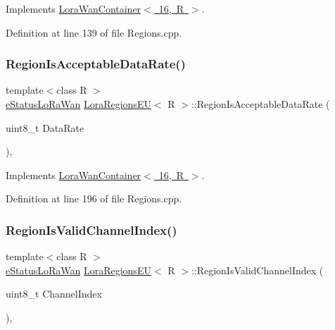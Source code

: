 Implements \mbox{\hyperlink{class_lora_wan_container_aeacbb5b9a6ca06708c095c2f67aae93e}{Lora\+Wan\+Container$<$ 16, R $>$}}.



Definition at line 139 of file Regions.\+cpp.

\mbox{\label{class_lora_regions_e_u_a367dcb126971269dce46511383696bad}} 
\subsubsection{\texorpdfstring{Region\+Is\+Acceptable\+Data\+Rate()}{RegionIsAcceptableDataRate()}}
{\footnotesize\ttfamily template$<$class R $>$ \\
\mbox{\hyperlink{_define_8h_a1cea710adbbf5b02bced8f79cd82f7b9}{e\+Status\+Lo\+Ra\+Wan}} \mbox{\hyperlink{class_lora_regions_e_u}{Lora\+Regions\+EU}}$<$ R $>$\+::Region\+Is\+Acceptable\+Data\+Rate (\begin{DoxyParamCaption}\item[{uint8\+\_\+t}]{Data\+Rate }\end{DoxyParamCaption})\hspace{0.3cm}{\ttfamily [protected]}, {\ttfamily [virtual]}}



Implements \mbox{\hyperlink{class_lora_wan_container_a8316ea2c314c3809fa7c6b8e72e25df0}{Lora\+Wan\+Container$<$ 16, R $>$}}.



Definition at line 196 of file Regions.\+cpp.

\mbox{\label{class_lora_regions_e_u_a265374672b836ead15fe670d9207bf4e}} 
\subsubsection{\texorpdfstring{Region\+Is\+Valid\+Channel\+Index()}{RegionIsValidChannelIndex()}}
{\footnotesize\ttfamily template$<$class R $>$ \\
\mbox{\hyperlink{_define_8h_a1cea710adbbf5b02bced8f79cd82f7b9}{e\+Status\+Lo\+Ra\+Wan}} \mbox{\hyperlink{class_lora_regions_e_u}{Lora\+Regions\+EU}}$<$ R $>$\+::Region\+Is\+Valid\+Channel\+Index (\begin{DoxyParamCaption}\item[{uint8\+\_\+t}]{Channel\+Index }\end{DoxyParamCaption})\hspace{0.3cm}{\ttfamily [protected]}, {\ttfamily [virtual]}}



